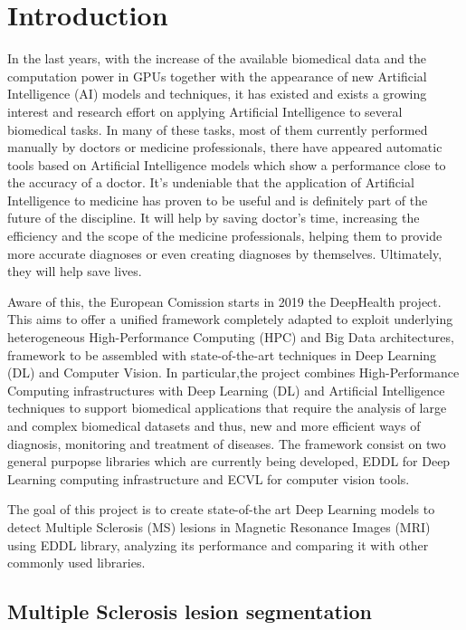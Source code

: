 \chapter{Introduction} 
\label{1.Introduction}


In the last years, with the increase of the available biomedical data and the computation power in GPUs together with the appearance of new Artificial Intelligence (AI) models and techniques, it has existed and exists a growing interest and research effort on applying Artificial Intelligence to several biomedical tasks. In many of these tasks, most of them currently performed manually by doctors or medicine professionals, there have appeared automatic tools based on Artificial Intelligence models which show a performance close to the accuracy of a doctor. It's undeniable that the application of Artificial Intelligence to medicine has proven to be useful and is definitely part of the future of the discipline. It will help by saving doctor's time, increasing the efficiency and the scope of the medicine professionals, helping them to provide more accurate diagnoses or even creating diagnoses by themselves. Ultimately, they will help save lives.

Aware of this, the European Comission starts in 2019 the DeepHealth project. This aims to offer a unified framework completely adapted to exploit underlying heterogeneous High-Performance Computing (HPC) and Big Data architectures, framework to be assembled with state-of-the-art techniques in Deep Learning (DL) and Computer Vision. In particular,the project combines High-Performance Computing infrastructures with Deep Learning (DL) and Artificial Intelligence techniques to support biomedical applications that require the analysis of large and complex biomedical datasets and thus, new and more efficient ways of diagnosis, monitoring and treatment of diseases. The framework consist on two general purpopse libraries which are currently being developed, EDDL for Deep Learning computing infrastructure and ECVL for computer vision tools. 

The goal of this project is to create state-of-the art Deep Learning models to detect Multiple Sclerosis (MS) lesions in Magnetic Resonance Images (MRI) using EDDL library, analyzing its performance and comparing it with other commonly used libraries.



\section{Multiple Sclerosis lesion segmentation}

